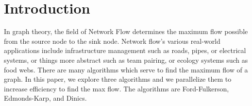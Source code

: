 \section{Introduction}

In graph theory, the field of Network Flow determines the maximum flow possible from the source node to the sink node. Network flow’s various real-world applications include infrastructure management such as roads, pipes, or electrical systems, or things more abstract such as team pairing, or ecology systems such as food webs. There are many algorithms which serve to find the maximum flow of a graph. In this paper, we explore three algorithms and we parallelize them to increase efficiency to find the max flow. The algorithms are Ford-Fulkerson, Edmonds-Karp, and Dinics.